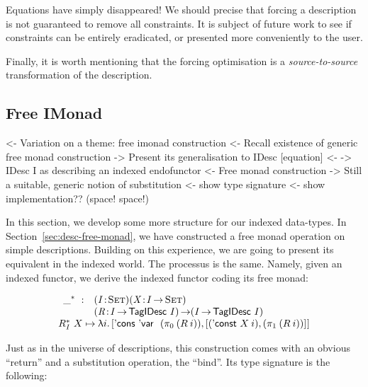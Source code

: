 Equations have simply disappeared! We should precise that forcing a
description is not guaranteed to remove all constraints. It is subject
of future work to see if constraints can be entirely eradicated, or
presented more conveniently to the user.

Finally, it is worth mentioning that the forcing optimisation is a
\emph{source-to-source} transformation of the description. 


\subsection{Free IMonad}

\begin{wstructure}
<- Variation on a theme: free imonad construction
    <- Recall existence of generic free monad construction
    -> Present its generalisation to IDesc [equation]
        <- \I -> IDesc I as describing an indexed endofunctor
        <- Free monad construction
    -> Still a suitable, generic notion of substitution
        <- show type signature
        <- show implementation?? (space! space!)
\end{wstructure}

In this section, we develop some more structure for our indexed
data-types. In Section~\ref{sec:desc-free-monad}, we have constructed
a free monad operation on simple descriptions. Building on this
experience, we are going to present its equivalent in the indexed
world. The processus is the same. Namely, given an indexed functor, we
derive the indexed functor coding its free monad:

\[\stk{
\begin{array}{ll}
\FreeIMonad{\_}{} : & \PITEL{\V{I}}{\Set}
                      \PITEL{\V{X}}{\V{I} \To \Set} \\
                    & \PITEL{\V{R}}{\V{I} \To \TagIDesc{I}} \To
                      (\V{I} \To \TagIDesc{I})
\end{array} \\
\FreeIMonad{R}{I}{X} \mapsto
    \LAM{i}
    \pair{\ListCons{\DVar{}}{(\fst{(R\: i)})}}
         {\pair{(\DConst{X\: i})}
               {(\snd{(R\: i)})}{}}{}
}\]

Just as in the universe of descriptions, this construction comes with
an obvious ``return'' and a substitution operation, the ``bind''. Its
type signature is the following:

\newcommand{\substI}{\F{substI}}

